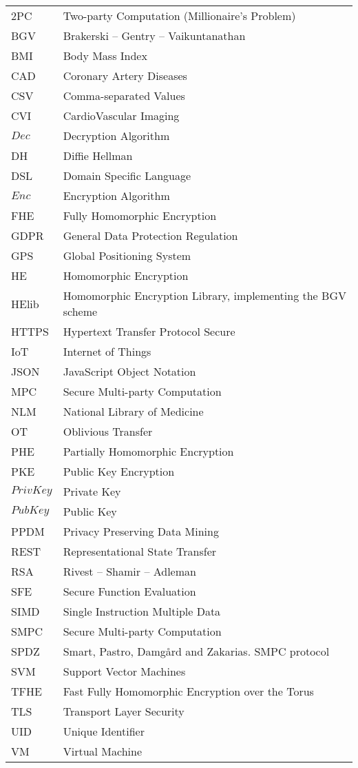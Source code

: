 \abbreviations
\begin{center}
	\renewcommand{\arraystretch}{1.5}
	\begin{longtable}{ l @{\qquad} l }
	\toprule
	2PC       & Two-party Computation (Millionaire's Problem) \\
	BGV       & Brakerski -- Gentry -- Vaikuntanathan \\
	BMI       & Body Mass Index \\
	CAD 			& Coronary Artery Diseases \\
	CSV 			& Comma-separated Values \\
	CVI 			& CardioVascular Imaging \\
	$Dec$     & Decryption Algorithm \\
	DH				& Diffie Hellman \\
	DSL       & Domain Specific Language \\
	$Enc$     & Encryption Algorithm \\
	FHE       & Fully Homomorphic Encryption \\
	GDPR 			& General Data Protection Regulation\\
	GPS 			& Global Positioning System \\
	HE        & Homomorphic Encryption \\
	HElib     & Homomorphic Encryption Library, implementing the BGV scheme \\
	HTTPS 		& Hypertext Transfer Protocol Secure \\
	IoT				& Internet of Things \\
	JSON 			& JavaScript Object Notation \\
	MPC 			& Secure Multi-party Computation \\
	NLM 			& National Library of Medicine \\
	OT        & Oblivious Transfer \\
	PHE       & Partially Homomorphic Encryption \\
	PKE 			& Public Key Encryption \\
	$PrivKey$	& Private Key \\
	$PubKey$  & Public Key \\
	PPDM      & Privacy Preserving Data Mining \\
	REST      & Representational State Transfer \\
	RSA				& Rivest -- Shamir -- Adleman \\
	SFE       & Secure Function Evaluation \\
	SIMD      & Single Instruction Multiple Data \\
	SMPC 			& Secure Multi-party Computation \\
	SPDZ      & Smart, Pastro, Damg{\aa}rd and Zakarias. SMPC protocol \\
	SVM 			& Support Vector Machines \\
	TFHE      & Fast Fully Homomorphic Encryption over the Torus \\
	TLS 			& Transport Layer Security \\
	UID 			& Unique Identifier \\
	VM				& Virtual Machine \\

	\bottomrule
	\end{longtable}
\end{center}
